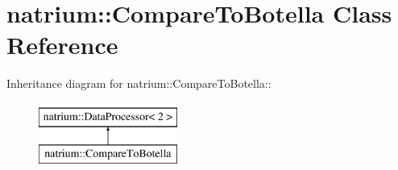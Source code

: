 \hypertarget{classnatrium_1_1CompareToBotella}{
\section{natrium::CompareToBotella Class Reference}
\label{classnatrium_1_1CompareToBotella}
}
Inheritance diagram for natrium::CompareToBotella::\begin{figure}[H]
\begin{center}
\leavevmode
\includegraphics[height=2cm]{classnatrium_1_1CompareToBotella}
\end{center}
\end{figure}
